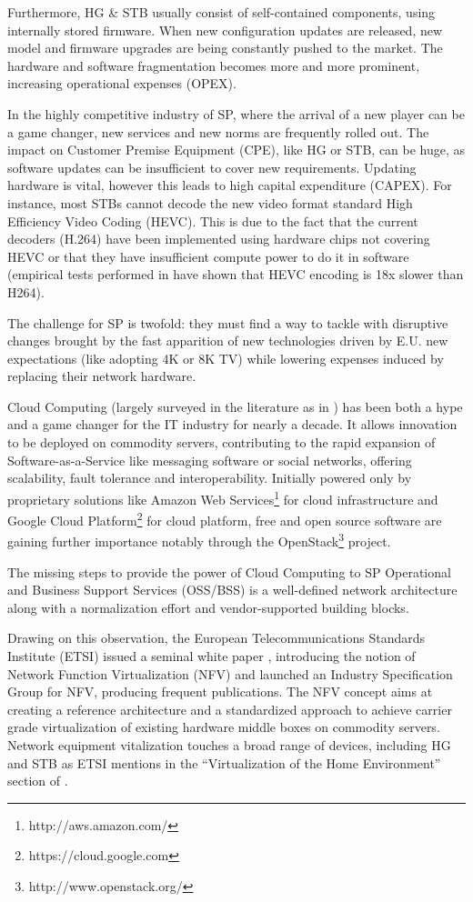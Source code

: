Furthermore, HG \& STB usually consist of self-contained components, using internally stored firmware.
When new configuration updates are released, new model and firmware upgrades are being constantly pushed to the market.
The hardware and software fragmentation becomes more and more prominent, increasing operational expenses (OPEX). 

In the highly competitive industry of SP, where the arrival of a new player can be a game changer, new services and new norms are frequently rolled out.
The impact on Customer Premise Equipment (CPE), like HG or STB, can be huge, as software updates can be insufficient to cover new requirements.
Updating hardware is vital, however this leads to high capital expenditure (CAPEX).
For instance, most STBs cannot decode the new video format standard  High Efficiency Video Coding (HEVC).
This is due to the fact that the current decoders (H.264) have been implemented using hardware chips not covering HEVC or that they have insufficient compute power to do it in software (empirical tests performed in \cite{grois_performance_2013} have shown that HEVC encoding is 18x slower than H264).

The challenge for SP is twofold: they must find a way to tackle with disruptive changes brought by the fast apparition of new technologies driven by E.U. new expectations (like adopting 4K or 8K TV) while lowering expenses induced by replacing their network hardware.

Cloud Computing (largely surveyed in the literature as in \cite{rimal_taxonomy_2009}) has been both a hype and a game changer for the IT industry for nearly a decade.
It allows innovation to be deployed on commodity servers, contributing to the rapid expansion of Software-as-a-Service like messaging software or social networks, offering scalability, fault tolerance and interoperability.
Initially powered only by proprietary solutions like Amazon Web Services\footnote{http://aws.amazon.com/} for cloud infrastructure and Google Cloud Platform\footnote{https://cloud.google.com} for cloud platform, free and open source software are gaining further importance notably through the OpenStack\footnote{http://www.openstack.org/} project. 

The missing steps to provide the power of Cloud Computing to SP Operational and Business Support Services (OSS/BSS) is a well-defined network architecture along with a normalization effort and vendor-supported building blocks.

Drawing on this observation, the European Telecommunications Standards Institute (ETSI) issued a seminal white paper \cite{_network_2012}, introducing the notion of Network Function Virtualization (NFV) and launched an Industry Specification Group for NFV, producing frequent publications.
The NFV concept aims at creating a reference architecture and a standardized approach to achieve carrier grade virtualization of existing hardware middle boxes on commodity servers.
Network equipment vitalization touches a broad range of devices, including HG and STB as ETSI mentions in the “Virtualization of the Home Environment” section of \cite{_network_2013}. 

